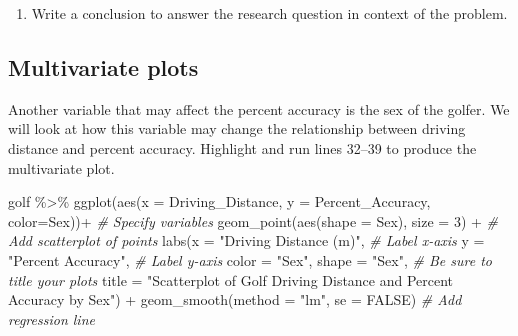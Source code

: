 \documentclass[
]{report}
\newenvironment{Shaded}{\begin{snugshade}}{\end{snugshade}}
\newcommand{\AttributeTok}[1]{\textcolor[rgb]{0.77,0.63,0.00}{#1}}
\newcommand{\CommentTok}[1]{\textcolor[rgb]{0.56,0.35,0.01}{\textit{#1}}}
\newcommand{\ConstantTok}[1]{\textcolor[rgb]{0.00,0.00,0.00}{#1}}
\newcommand{\DecValTok}[1]{\textcolor[rgb]{0.00,0.00,0.81}{#1}}
\newcommand{\FunctionTok}[1]{\textcolor[rgb]{0.00,0.00,0.00}{#1}}
\newcommand{\NormalTok}[1]{#1}
\newcommand{\SpecialCharTok}[1]{\textcolor[rgb]{0.00,0.00,0.00}{#1}}
\newcommand{\StringTok}[1]{\textcolor[rgb]{0.31,0.60,0.02}{#1}}
\providecommand{\tightlist}{%
  \setlength{\itemsep}{0pt}\setlength{\parskip}{0pt}}
\begin{document}
\begin{enumerate}
\def\labelenumi{\arabic{enumi}.}
\setcounter{enumi}{13}
\tightlist
\item
  Write a conclusion to answer the research question in context of the problem.
\end{enumerate}

\vspace{.8in}

\hypertarget{multivariate-plots}{%
\subsection*{Multivariate plots}\label{multivariate-plots}}

Another variable that may affect the percent accuracy is the sex of the golfer. We will look at how this variable may change the relationship between driving distance and percent accuracy. Highlight and run lines 32--39 to produce the multivariate plot.

\begin{Shaded}
\begin{Highlighting}[]
\NormalTok{golf }\SpecialCharTok{\%\textgreater{}\%}
  \FunctionTok{ggplot}\NormalTok{(}\FunctionTok{aes}\NormalTok{(}\AttributeTok{x =}\NormalTok{ Driving\_Distance, }\AttributeTok{y =}\NormalTok{ Percent\_Accuracy, }\AttributeTok{color=}\NormalTok{Sex))}\SpecialCharTok{+}  \CommentTok{\# Specify variables}
  \FunctionTok{geom\_point}\NormalTok{(}\FunctionTok{aes}\NormalTok{(}\AttributeTok{shape =}\NormalTok{ Sex), }\AttributeTok{size =} \DecValTok{3}\NormalTok{) }\SpecialCharTok{+}  \CommentTok{\# Add scatterplot of points}
  \FunctionTok{labs}\NormalTok{(}\AttributeTok{x =} \StringTok{"Driving Distance (m)"}\NormalTok{,  }\CommentTok{\# Label x{-}axis}
       \AttributeTok{y =} \StringTok{"Percent Accuracy"}\NormalTok{,  }\CommentTok{\# Label y{-}axis}
       \AttributeTok{color =} \StringTok{"Sex"}\NormalTok{, }\AttributeTok{shape =} \StringTok{"Sex"}\NormalTok{,}
       \CommentTok{\# Be sure to title your plots}
       \AttributeTok{title =} \StringTok{"Scatterplot of Golf Driving Distance and Percent Accuracy by Sex"}\NormalTok{) }\SpecialCharTok{+} 
  \FunctionTok{geom\_smooth}\NormalTok{(}\AttributeTok{method =} \StringTok{"lm"}\NormalTok{, }\AttributeTok{se =} \ConstantTok{FALSE}\NormalTok{)  }\CommentTok{\# Add regression line}
\end{Highlighting}
\end{Shaded}
\end{document}
